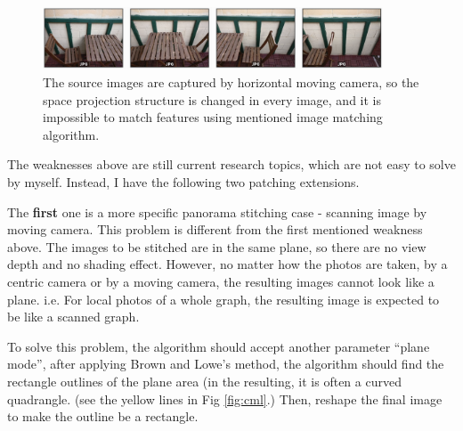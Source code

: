 \documentclass[10pt,twocolumn,letterpaper]{article}
\begin{document}
\begin{figure}
    \begin{center}
        \includegraphics[width=0.9\textwidth]{horizontal_motion}
    \end{center}
    \caption{The source images are captured by horizontal moving camera, so the space projection structure is changed in every image,
    and it is impossible to match features using mentioned image matching algorithm.}
    \label{fig:cameramotion}
\end{figure}

The weaknesses above are still current research topics, which are not easy to solve by myself. Instead, I have the following two patching extensions.

The \textbf{first} one is a more specific panorama stitching case - scanning image by moving camera.
This problem is different from the first mentioned weakness above.
The images to be stitched are in the same plane, so there are no view depth and no shading effect.
However, no matter how the photos are taken, by a centric camera or by a moving camera, the resulting images cannot look like a plane.
i.e. For local photos of a whole graph, the resulting image is expected to be like a scanned graph.

To solve this problem, the algorithm should accept another parameter ``plane mode'',
after applying Brown and Lowe's method, the algorithm should find the rectangle outlines of the plane area
(in the resulting, it is often a curved quadrangle. (see the yellow lines in Fig \ref{fig:cml}.)
Then, reshape the final image to make the outline be a rectangle.
\end{document}
